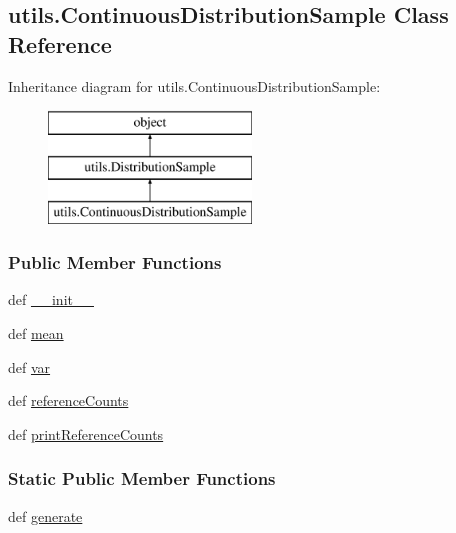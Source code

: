 \hypertarget{classutils_1_1ContinuousDistributionSample}{\subsection{utils.\-Continuous\-Distribution\-Sample Class Reference}
\label{classutils_1_1ContinuousDistributionSample}
}
Inheritance diagram for utils.\-Continuous\-Distribution\-Sample\-:\begin{figure}[H]
\begin{center}
\leavevmode
\includegraphics[height=3.000000cm]{classutils_1_1ContinuousDistributionSample}
\end{center}
\end{figure}
\subsubsection*{Public Member Functions}
\begin{DoxyCompactItemize}
\item 
def \hyperlink{classutils_1_1ContinuousDistributionSample_ac029b6c47f3f44850897aea5b1fcbaad}{\-\_\-\-\_\-init\-\_\-\-\_\-}
\item 
def \hyperlink{classutils_1_1ContinuousDistributionSample_a5741ea080eee2dd9c4ea26095788a621}{mean}
\item 
def \hyperlink{classutils_1_1ContinuousDistributionSample_aa45afba3caa9a3ca1b5b7f1eee18039d}{var}
\item 
def \hyperlink{classutils_1_1ContinuousDistributionSample_a85ecd7becac4ad7397c4cf870b33a6af}{reference\-Counts}
\item 
def \hyperlink{classutils_1_1ContinuousDistributionSample_a8cbbe383c9a0239b10fb1286b1d5db9f}{print\-Reference\-Counts}
\end{DoxyCompactItemize}
\subsubsection*{Static Public Member Functions}
\begin{DoxyCompactItemize}
\item 
def \hyperlink{classutils_1_1ContinuousDistributionSample_a3f0e197f9e7b0181dcdfaae7095f7a3f}{generate}
\end{DoxyCompactItemize}
